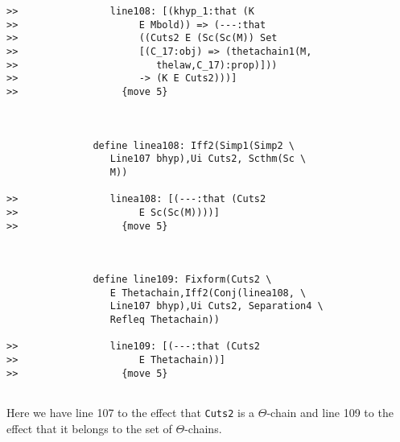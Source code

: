 \documentclass[12pt]{article}
\begin{document}
\begin{verbatim}
>>                line108: [(khyp_1:that (K
>>                     E Mbold)) => (---:that
>>                     ((Cuts2 E (Sc(Sc(M)) Set
>>                     [(C_17:obj) => (thetachain1(M,
>>                        thelaw,C_17):prop)]))
>>                     -> (K E Cuts2)))]
>>                  {move 5}



               define linea108: Iff2(Simp1(Simp2 \
                  Line107 bhyp),Ui Cuts2, Scthm(Sc \
                  M))

>>                linea108: [(---:that (Cuts2
>>                     E Sc(Sc(M))))]
>>                  {move 5}



               define line109: Fixform(Cuts2 \
                  E Thetachain,Iff2(Conj(linea108, \
                  Line107 bhyp),Ui Cuts2, Separation4 \
                  Refleq Thetachain))

>>                line109: [(---:that (Cuts2
>>                     E Thetachain))]
>>                  {move 5}


\end{verbatim}

Here we have line 107 to the effect that {\tt Cuts2} is a $\Theta$-chain and line 109 to the effect that it belongs to the set of $\Theta$-chains.
\end{document}
